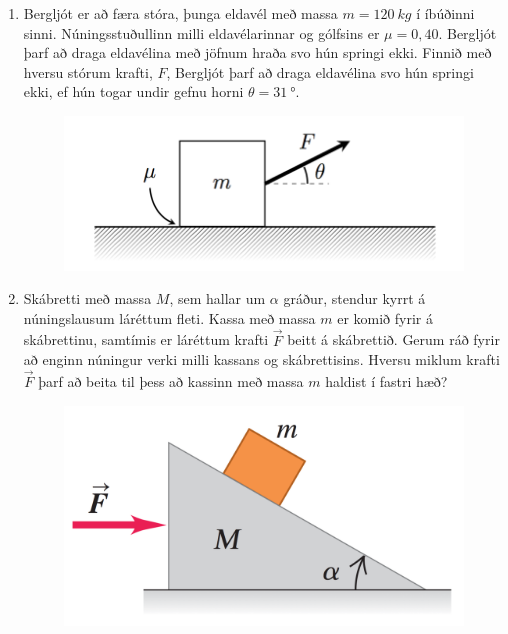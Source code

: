 \begin{enumerate}[label = \textbf{Dæmi \thechapter.\arabic*.}]
\item Bergljót er að færa stóra, þunga eldavél með massa $m = \SI{120}{kg}$ í íbúðinni sinni. Núningsstuðullinn milli eldavélarinnar og gólfsins er $\mu = 0,40$. Bergljót þarf að draga eldavélina með jöfnum hraða svo hún springi ekki. Finnið með hversu stórum krafti, $F$, Bergljót þarf að draga eldavélina svo hún springi ekki, ef hún togar undir gefnu horni $\theta = \SI{31}{\degree}$.

\begin{figure}[H]
    \centering
    \includegraphics[scale = 0.5]{images/kommoda.png}
\end{figure}

\vspace{-0.5cm}

\item Skábretti með massa $M$, sem hallar um $\alpha$ gráður, stendur kyrrt á núningslausum láréttum fleti. Kassa með massa $m$ er komið fyrir á skábrettinu, samtímis er láréttum krafti $\Vec{F}$ beitt á skábrettið. Gerum ráð fyrir að enginn núningur verki milli kassans og skábrettisins. Hversu miklum krafti $\Vec{F}$ þarf að beita til þess að kassinn með massa $m$ haldist í fastri hæð?

\begin{figure}[H]
    \centering
    \includegraphics[scale = 0.3]{images/martrod.png}
\end{figure}


\end{enumerate}
